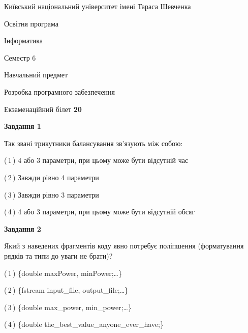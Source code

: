 \documentclass[10pt, ukrainian]{article}
\begin{document}
{{\begin {small}\par
{ \center  Київський національний університет імені Тараса Шевченка \par}
{\parbox {5 cm}{Освітня програма \hfill}{\parbox {7 cm}{Інформатика \hfill}}\parbox {6 cm}{\hfill Семестр 6}}\par
{\parbox {5 cm} {Навчальний предмет \hfill}\parbox {7 cm}{Розробка програмного забезпечення \hfill}\parbox {6cm}{\hfill}\par}\vspace{-7pt} \end{small}}{\center Екзаменаційний білет \No \textbf
{ 20 }\par}}
{
\begin {large}
{\begin {center}\textbf{Завдання 1}\end {center}}\par
Так звані трикутники балансування зв'язують між собою:\par
\vspace{2mm}



(\,1\,) 4 або 3 параметри, при цьому може бути відсутній час%



(\,2\,) Завжди рівно 4 параметри%



(\,3\,) Завжди рівно 3 параметри%



(\,4\,) 4 або 3 параметри, при цьому може бути відсутній обсяг %


{\begin {center}\textbf{Завдання 2}\end {center}}\par
Який з наведених фрагментів коду явно потребує поліпшення (форматування рядків та типи до уваги не брати)?\par
\vspace{2mm}



(\,1\,) \{double maxPower, minPower;…\} %



(\,2\,) \{fstream input\_file, output\_file;…\} %



(\,3\,) \{double max\_power, min\_power;…\} %



(\,4\,) \{double the\_best\_value\_anyone\_ever\_have;\} %



\end{large}}
\end{document}
